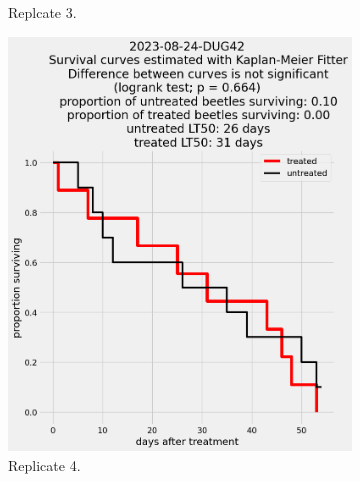 \documentclass[12pt,letterpaper,english,bibliography=totocnumbered, abstract=on]{scrartcl}
\begin{document}
\begin{figure}[h]
\begin{subfigure}{.3\textwidth}
		\caption{Replcate 3.}
	\end{subfigure}
	\begin{subfigure}{.3\textwidth}
		\includegraphics[width=\textwidth]{images/survival_curves/2023-08-24-DUG42}
		\caption{Replicate 4.}
	\end{subfigure}
	\begin{subfigure}{.3\textwidth}

\end{subfigure}
\end{figure}
\end{document}
